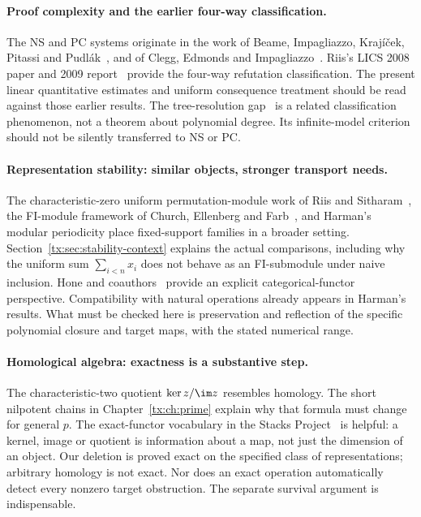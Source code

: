 \paragraph{Proof complexity and the earlier four-way classification.}
The NS and PC systems originate in the work of Beame, Impagliazzo,
Kraj\'i\v cek, Pitassi and Pudl\'ak~\cite{NSFoundations}, and of Clegg,
Edmonds and Impagliazzo~\cite{PCFoundations}. Riis's LICS 2008 paper
and 2009 report~\cite{Riis,RiisLong} provide the four-way refutation
classification. The present linear quantitative estimates and uniform
consequence treatment should be read against those earlier results.
The tree-resolution gap~\cite{RiisTree} is a related classification
phenomenon, not a theorem about polynomial degree. Its infinite-model
criterion should not be silently transferred to NS or PC.

\paragraph{Representation stability: similar objects, stronger transport needs.}
The characteristic-zero uniform permutation-module work of Riis and
Sitharam~\cite{RiisSitharamModules}, the FI-module framework of Church,
Ellenberg and Farb~\cite{CEF}, and Harman's modular periodicity
\cite{Harman} place fixed-support families in a broader setting.
Section~\ref{tx:sec:stability-context} explains the actual comparisons,
including why the uniform sum $\sum_{i<n}x_i$ does not behave as an
FI-submodule under naive inclusion. Hone and coauthors~\cite{HKPSYZ}
provide an explicit categorical-functor perspective. Compatibility with
natural operations already appears in Harman's results. What must be
checked here is preservation and reflection of the specific polynomial
closure and target maps, with the stated numerical range.

\paragraph{Homological algebra: exactness is a substantive step.}
The characteristic-two quotient $\ker z/\im z$ resembles homology.
The short nilpotent chains in Chapter~\ref{tx:ch:prime} explain why
that formula must change for general $p$. The exact-functor vocabulary
in the Stacks Project~\cite{StacksExact} is helpful: a kernel, image or
quotient is information about a map, not just the dimension of an
object. Our deletion is proved exact on the specified class of
representations; arbitrary homology is not exact. Nor does an exact
operation automatically detect every nonzero target obstruction.
The separate survival argument is indispensable.

